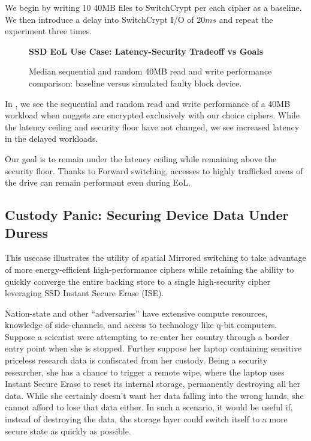 We begin by writing 10 40MB files to SwitchCrypt per each cipher as a baseline.
We then introduce a delay into SwitchCrypt I/O of $20ms$ and repeat the
experiment three times.

\begin{figure}[ht] \textbf{SSD EoL Use Case: Latency-Security Tradeoff vs
   Goals}\par\medskip
   {} \caption{Median sequential and
   random 40MB read and write performance comparison: baseline versus simulated
   faulty block device.}
  \label{fig:usecase-eol-tradeoff}
\end{figure}

In , we see the sequential and random read and
write performance of a 40MB workload when nuggets are encrypted exclusively with
our choice ciphers. While the latency ceiling and security floor have not
changed, we see increased latency in the delayed workloads.

Our goal is to remain under the latency ceiling while remaining above the
security floor. Thanks to Forward switching, accesses to highly trafficked areas
of the drive can remain performant even during EoL.

\subsection{Custody Panic: Securing Device Data Under Duress}

This usecase illustrates the utility of spatial Mirrored switching to take
advantage of more energy-efficient high-performance ciphers while retaining the
ability to quickly converge the entire backing store to a single high-security
cipher leveraging SSD Instant Secure Erase (ISE).

Nation-state and other ``adversaries'' have extensive compute resources,
knowledge of side-channels, and access to technology like q-bit computers. 
Suppose a scientist were attempting to re-enter her country through a border
entry point when she is stopped. Further suppose her laptop containing sensitive
priceless research data is confiscated from her custody. Being a security
researcher, she has a chance to trigger a remote wipe, where the laptop uses
Instant Secure Erase to reset its internal storage, permanently destroying all
her data. While she certainly doesn't want her data falling into the wrong
hands, she cannot afford to lose that data either. In such a scenario, it would
be useful if, instead of destroying the data, the storage layer could switch
itself to a more secure state as quickly as possible.

